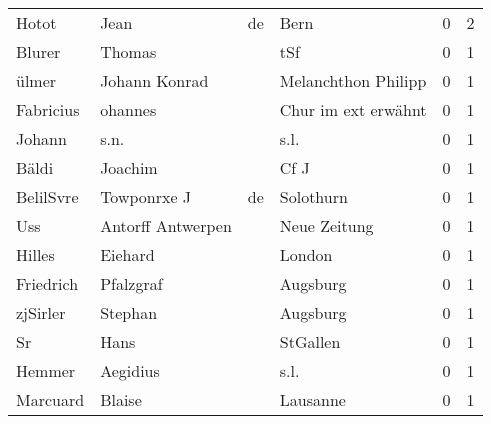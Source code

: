 \documentclass[10pt,a4paper,landscape]{article}
\begin{document}
\begin{longtable}{llllrr}
                    Hotot &                               Jean &          de &                                        Bern &          0 &         2 \\
                   Blurer &                             Thomas &             &                                         tSf &          0 &         1 \\
                    ülmer &                      Johann Konrad &             &                         Melanchthon Philipp &          0 &         1 \\
                Fabricius &                            ohannes &             &                         Chur im ext erwähnt &          0 &         1 \\
                   Johann &                               s.n. &             &                                        s.l. &          0 &         1 \\
                    Bäldi &                            Joachim &             &                                        Cf J &          0 &         1 \\
                BelilSvre &                        Towponrxe J &          de &                                   Solothurn &          0 &         1 \\
                      Uss &                  Antorff Antwerpen &             &                                Neue Zeitung &          0 &         1 \\
                   Hilles &                            Eiehard &             &                                      London &          0 &         1 \\
                Friedrich &                          Pfalzgraf &             &                                    Augsburg &          0 &         1 \\
                 zjSirler &                            Stephan &             &                                    Augsburg &          0 &         1 \\
                       Sr &                               Hans &             &                                    StGallen &          0 &         1 \\
                   Hemmer &                           Aegidius &             &                                        s.l. &          0 &         1 \\
                 Marcuard &                             Blaise &             &                                    Lausanne &          0 &         1 \\

\end{longtable}
\end{document}
